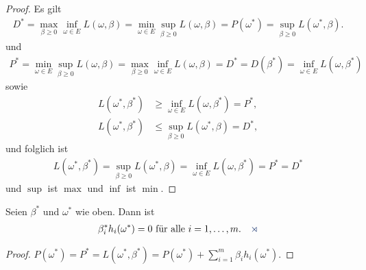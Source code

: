 \begin{proof}
Es gilt
\begin{align*}
D^* = \max_{\beta\ge 0}\inf_{\omega\in E} L(\omega, \beta) = 
\min_{\omega\in E}\sup_{\beta\ge 0} L(\omega,\beta)
= P(\omega^*) = \sup_{\beta\ge 0} L(\omega^*,\beta).
\end{align*}
und
\begin{align*}
P^* = \min_{\omega\in E}\sup_{\beta\ge 0} L(\omega,\beta) = \max_{\beta \ge 0}
\inf_{\omega\in E} L(\omega, \beta) = D^* =D(\beta^*) = \inf_{\omega\in E}
L(\omega, \beta^*)
\end{align*}
sowie
\begin{align*}
L(\omega^*,\beta^*) &\ge \inf_{\omega\in E} L(\omega, \beta^*) = P^*,\\
L(\omega^*,\beta^*) &\le \sup_{\beta\ge 0} L(\omega^*, \beta) = D^*,
\end{align*}
und folglich ist
\begin{align*}
L(\omega^*,\beta^*) = \sup_{\beta \ge 0} L(\omega^*,\beta) = \inf_{\omega\in E}
L(\omega,\beta^*) = P^* = D^*
\end{align*}
und $\sup$ ist $\max$ und $\inf$ ist $\min$.\qedhere
\end{proof}

\begin{cor*}
Seien $\beta^*$ und $\omega^*$ wie oben. Dann ist
\begin{align*}
\beta_i^* h_i(\omega^*) = 0\text{ für alle } i=1,\ldots,m.\fishhere
\end{align*}
\end{cor*}
\begin{proof}
$P(\omega^*) = P^* = L(\omega^*,\beta^*) = P(\omega^*) + \sum_{i=1}^m \beta_i
h_i(\omega^*)$.\qedhere
\end{proof}

